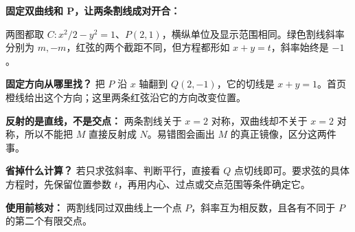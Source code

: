 \clearpage
\begin{explanationbox}
\textbf{固定双曲线和 P，让两条割线成对开合：}

\begin{center}

\end{center}

两图都取 $C:x^2/2-y^2=1$、$P(2,1)$，横纵单位及显示范围相同。绿色割线斜率分别为 $m,-m$，红弦的两个截距不同，但方程都形如 $x+y=t$，斜率始终是 $-1$。

\medskip
\textbf{固定方向从哪里找？} 把 $P$ 沿 $x$ 轴翻到 $Q(2,-1)$，它的切线是 $x+y=1$。首页橙线给出这个方向；这里两条红弦沿它的方向改变位置。

\medskip
\textbf{反射的是直线，不是交点：} 两条割线关于 $x=2$ 对称，双曲线却不关于 $x=2$ 对称，所以不能把 $M$ 直接反射成 $N$。易错图会画出 $M$ 的真正镜像，区分这两件事。

\medskip
\textbf{省掉什么计算？} 若只求弦斜率、判断平行，直接看 $Q$ 点切线即可。要求弦的具体方程时，先保留位置参数 $t$，再用内心、过点或交点范围等条件确定它。

\medskip
\textbf{使用前核对：} 两割线同过双曲线上一个点 $P$，斜率互为相反数，且各有不同于 $P$ 的第二个有限交点。
\end{explanationbox}
